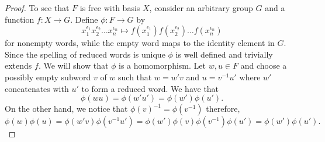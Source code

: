\documentclass[12pt]{article}
\theoremstyle{definition}
\numberwithin{equation}{theorem}
\begin{document}
\begin{proof}
  To see that $F$ is free with basis $X$, consider an arbitrary group $G$ and a function $f:X \rightarrow G$. Define $\phi: F \rightarrow G$ by
  \[
    x_1^{\epsilon_1}x_2^{\epsilon_2} \dots x_n^{\epsilon_n} \mapsto f(x_1^{\epsilon_1})f(x_2^{\epsilon_2}) \dots f(x_n^{\epsilon_n})
  \]
  for nonempty words, while the empty word maps to the identity element in $G$. Since the spelling of reduced words is unique $\phi$ is well defined and trivially extends $f$. We will show that $\phi$ is a homomorphism. Let $w,u \in F$ and choose a possibly empty subword $v$ of $w$ such that $w=w'v$ and $u=v^{-1}u'$ where $w'$ concatenates with $u'$ to form a reduced word. We have that
  \[
    \phi(wu) = \phi(w'u') = \phi(w')\phi(u').
  \]
  On the other hand, we notice that $\phi(v)^{-1} = \phi(v^{-1})$ therefore,
  \[
    \phi(w)\phi(u) = \phi(w'v)\phi(v^{-1}u') = \phi(w')\phi(v)\phi(v^{-1})\phi(u') = \phi(w')\phi(u').
  \]


  

\end{proof}
\end{document}
